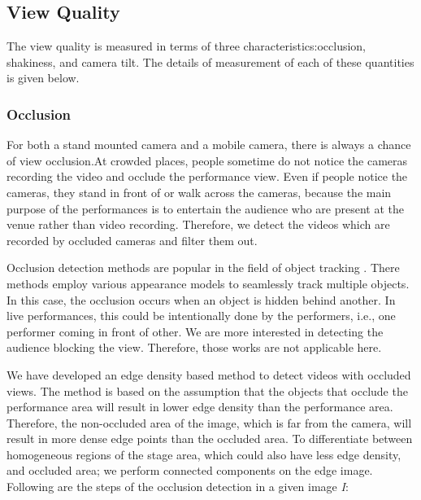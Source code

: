\documentclass{sig-alternate-05-2015}
\begin{document}
\subsection{View Quality}
The view quality is measured in terms of three characteristics:occlusion, shakiness, and camera tilt. The details of measurement
of each of these quantities is given below.

\subsubsection{Occlusion}
For both a stand mounted camera and a mobile camera, there is always a chance of view occlusion.At crowded places, people
sometime do not notice the cameras recording the video and occlude the performance view. Even if people notice the cameras,
they stand in front of or walk across the cameras, because the main
purpose of the performances is to entertain the audience who are
present at the venue rather than video recording. Therefore, we detect the videos which are recorded by occluded cameras and filter
them out.

Occlusion detection methods are popular in the field of object
tracking \cite{13,19}. There methods employ various appearance models to seamlessly track multiple objects. In this case, the occlusion
occurs when an object is hidden behind another. In live performances, this could be intentionally done by the performers, i.e.,
one performer coming in front of other. We are more interested in
detecting the audience blocking the view. Therefore, those works
are not applicable here.

We have developed an edge density based method to detect videos with occluded views. The method is based on the assumption that
the objects that occlude the performance area will result in lower
edge density than the performance area. Therefore, the non-occluded
area of the image, which is far from the camera, will result in more
dense edge points than the occluded area. To differentiate between
homogeneous regions of the stage area, which could also have less edge density, and occluded area; we perform connected components on the edge image. Following are the steps of the occlusion
detection in a given image \textit{I}:
\end{document}
